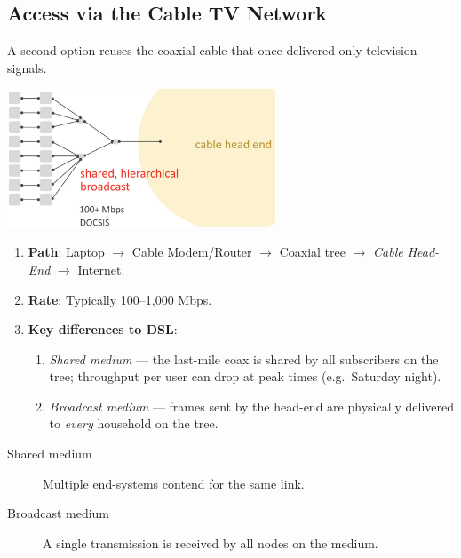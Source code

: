 \documentclass[../../compsys.tex]{subfiles}
\begin{document}
\subsection{Access via the Cable TV Network}
A second option reuses the coaxial cable that once delivered only
television signals.

\begin{center}
  \includegraphics[width=0.6\textwidth]{images/tv-line.png}
\end{center}

\begin{enumerate}
  \item \textbf{Path}: Laptop $\rightarrow$ Cable Modem/Router $\rightarrow$
        Coaxial tree $\rightarrow$ \emph{Cable Head-End} $\rightarrow$ Internet.
  \item \textbf{Rate}: Typically 100--1,000 Mbps.
  \item \textbf{Key differences to DSL}:
        \begin{enumerate}
          \item \textit{Shared medium} — the last-mile coax is shared by
                all subscribers on the tree; throughput per user can drop
                at peak times (e.g.\ Saturday night).
          \item \textit{Broadcast medium} — frames sent by the head-end are
                physically delivered to \emph{every} household on the tree.
        \end{enumerate}
\end{enumerate}

\begin{description}
  \item[Shared medium] Multiple end-systems contend for the same link.
  \item[Broadcast medium] A single transmission is received by all nodes
        on the medium.
\end{description}


\end{document}
